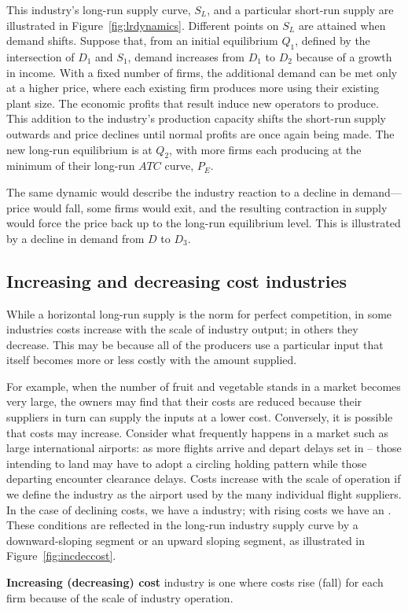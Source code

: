 This industry's long-run supply curve, $S_L$, and a particular short-run supply are illustrated in Figure~\ref{fig:lrdynamics}. Different points on $S_L$ are attained when demand shifts. Suppose that, from an initial equilibrium $Q_1$, defined by the intersection of $D_1$ and $S_1$, demand increases from $D_1$ to $D_2$ because of a growth in income. With a fixed number of firms, the additional demand can be met only at a higher price, where each existing firm produces more using their existing plant size. The economic profits that result induce new operators to produce. This addition to the industry's production capacity shifts the short-run supply outwards and price declines until normal profits are once again being made. The new long-run equilibrium is at $Q_2$, with more firms each producing at the minimum of their long-run $ATC$ curve, $P_E$.



The same dynamic would describe the industry reaction to a decline in demand---price would fall, some firms would exit, and the resulting contraction in supply would force the price back up to the long-run equilibrium level. This is illustrated by a decline in demand from $D$ to $D_3$.

\subsection*{Increasing and decreasing cost industries}

While a horizontal long-run supply is the norm for perfect competition, in some industries costs increase with the scale of industry output; in others they decrease. This may be because all of the producers use a particular input that itself becomes more or less costly with the amount supplied.

For example, when the number of fruit and vegetable stands in a market becomes very large, the owners may find that their costs are reduced because their suppliers in turn can supply the inputs at a lower cost. Conversely, it is possible that costs may increase. Consider what frequently happens in a market such as large international airports: as more flights arrive and depart delays set in -- those intending to land may have to adopt a circling holding pattern while those departing encounter clearance delays. Costs increase with the scale of operation if we define the industry as the airport used by the many individual flight suppliers. In the case of declining costs, we have a  industry; with rising costs we have an . These conditions are reflected in the long-run industry supply curve by a downward-sloping segment or an upward sloping segment, as illustrated in Figure~\ref{fig:incdeccost}.



\begin{DefBox}
\textbf{Increasing (decreasing) cost} industry is one where costs rise (fall) for each firm because of the scale of industry operation.
\end{DefBox}